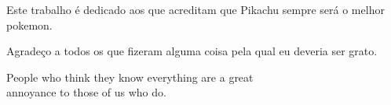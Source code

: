 \documentclass[times,english,brazil,oneside,section=TITLE]{ifes8}
\begin{document}







  


\begin{dedicatoria}
  \vspace*{\fill}
  \hspace{0.2\textwidth}
  \begin{minipage}{0.8\textwidth}
    Este trabalho é dedicado aos que acreditam que Pikachu sempre será o
    melhor pokemon.
  \end{minipage}
\end{dedicatoria}


\begin{agradecimentos}
  Agradeço a todos os que fizeram alguma coisa pela qual eu deveria
  ser grato.
\end{agradecimentos}


\begin{epigrafe}
  \vspace*{\fill}
  \begin{otherlanguage}{english}
    \begin{flushright}
      \begin{SingleSpace}
        People who think they know everything are a great \\
        annoyance to those of us who do. \cite{Asimov2004}
      \end{SingleSpace}
    \end{flushright}
  \end{otherlanguage}
\end{epigrafe}
\end{document}
